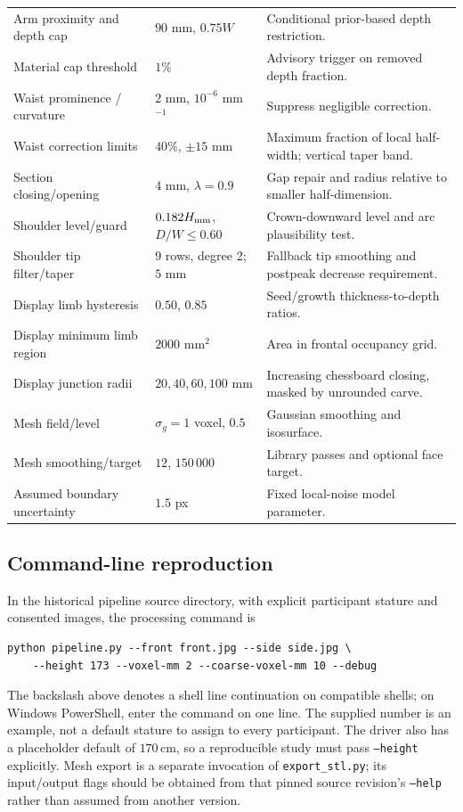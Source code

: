 \documentclass[11pt,a4paper]{article}
\numberwithin{equation}{section}
\begin{document}
\begin{longtable}{L{4.7cm}L{3.3cm}L{6.7cm}}
Arm proximity and depth cap & $90$ mm, $0.75W$ & Conditional prior-based depth restriction. \\
Material cap threshold & $1\%$ & Advisory trigger on removed depth fraction. \\
Waist prominence / curvature & $2$ mm, $10^{-6}$ mm$^{-1}$ & Suppress negligible correction. \\
Waist correction limits & $40\%$, $\pm15$ mm & Maximum fraction of local half-width; vertical taper band. \\
Section closing/opening & $4$ mm, $\lambda=0.9$ & Gap repair and radius relative to smaller half-dimension. \\
Shoulder level/guard & $0.182H_{\rm mm}$, $D/W\le0.60$ & Crown-downward level and arc plausibility test. \\
Shoulder tip filter/taper & $9$ rows, degree 2; $5$ mm & Fallback tip smoothing and postpeak decrease requirement. \\
Display limb hysteresis & $0.50$, $0.85$ & Seed/growth thickness-to-depth ratios. \\
Display minimum limb region & $2000$ mm$^2$ & Area in frontal occupancy grid. \\
Display junction radii & $20,40,60,100$ mm & Increasing chessboard closing, masked by unrounded carve. \\
Mesh field/level & $\sigma_g=1$ voxel, $0.5$ & Gaussian smoothing and isosurface. \\
Mesh smoothing/target & $12$, $150\,000$ & Library passes and optional face target. \\
Assumed boundary uncertainty & $1.5$ px & Fixed local-noise model parameter. \\
\end{longtable}

\subsection{Command-line reproduction}
In the historical pipeline source directory, with explicit participant stature and consented images, the processing command is
\begin{verbatim}
python pipeline.py --front front.jpg --side side.jpg \
    --height 173 --voxel-mm 2 --coarse-voxel-mm 10 --debug
\end{verbatim}
The backslash above denotes a shell line continuation on compatible shells; on Windows PowerShell, enter the command on one line. The supplied number is an example, not a default stature to assign to every participant. The driver also has a placeholder default of $170$\,cm, so a reproducible study must pass \texttt{--height} explicitly. Mesh export is a separate invocation of \nolinkurl{export_stl.py}; its input/output flags should be obtained from that pinned source revision's \texttt{--help} rather than assumed from another version.
\end{document}
